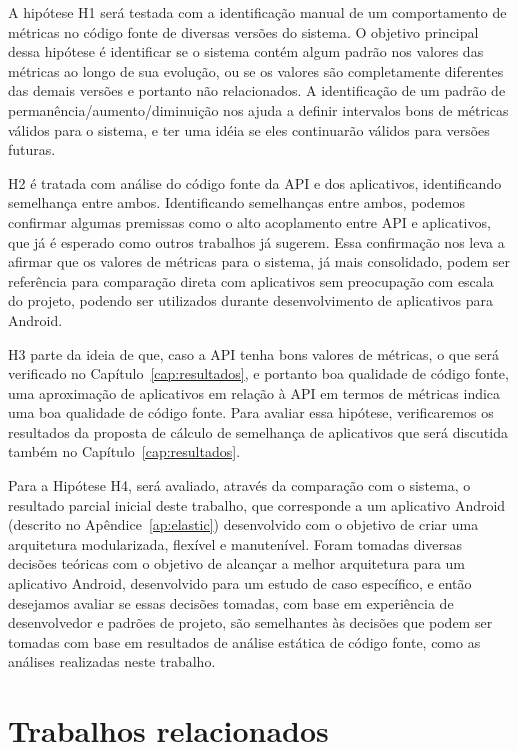 A hipótese H1 será testada com a identificação manual de um comportamento de métricas no código fonte de diversas versões do sistema. O objetivo principal dessa hipótese é identificar se o sistema contém algum padrão nos valores das métricas ao longo de sua evolução, ou se os valores são completamente diferentes das demais versões e portanto não relacionados. A identificação de um padrão de permanência/aumento/diminuição nos ajuda a definir intervalos bons de métricas válidos para o sistema, e ter uma idéia se eles continuarão válidos para versões futuras.

H2 é tratada com análise do código fonte da API e dos aplicativos, identificando semelhança entre ambos. Identificando semelhanças entre ambos, podemos confirmar algumas premissas como o alto acoplamento entre API e aplicativos, que já é esperado como outros trabalhos já sugerem. Essa confirmação nos leva a afirmar que os valores de métricas para o sistema, já mais consolidado, podem ser referência para comparação direta com aplicativos sem preocupação com escala do projeto, podendo ser utilizados durante desenvolvimento de aplicativos para Android.

H3 parte da ideia de que, caso a API tenha bons valores de métricas, o que será verificado no Capítulo~\ref{cap:resultados}, e portanto boa qualidade de código fonte, uma aproximação de aplicativos em relação à API em termos de métricas indica uma boa qualidade de código fonte. Para avaliar essa hipótese, verificaremos os resultados da proposta de cálculo de semelhança de aplicativos que será discutida também no Capítulo~\ref{cap:resultados}.

Para a Hipótese H4, será avaliado, através da comparação com o sistema, o resultado parcial inicial deste trabalho, que corresponde a um aplicativo Android (descrito no Apêndice~\ref{ap:elastic}) desenvolvido com o objetivo de criar uma arquitetura modularizada, flexível e manutenível. Foram tomadas diversas decisões teóricas com o objetivo de alcançar a melhor arquitetura para um aplicativo Android, desenvolvido para um estudo de caso específico, e então desejamos avaliar se essas decisões tomadas, com base em experiência de desenvolvedor e padrões de projeto, são semelhantes às decisões que podem ser tomadas com base em resultados de análise estática de código fonte, como as análises realizadas neste trabalho.

\section{Trabalhos relacionados}

